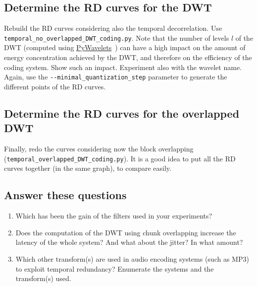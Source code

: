 \subsection{Determine the RD curves for the DWT}

Rebuild the RD curves considering also the temporal decorrelation. Use
\verb|temporal_no_overlapped_DWT_coding.py|. Note that the number of
levels $l$ of the DWT (computed using
\href{https://pywavelets.readthedocs.io/en/latest/}{PyWavelets}~\cite{lee2019pywavelets})
can have a high impact on the amount of energy concentration achieved
by the DWT, and therefore on the efficiency of the coding system. Show
such an impact. Experiment also with the wavelet name. Again, use the
\verb|--minimal_quantization_step| parameter to generate the different
points of the RD curves.


\subsection{Determine the RD curves for the overlapped DWT}

Finally, redo the curves considering now the block overlapping
(\verb|temporal_overlapped_DWT_coding.py|). It is a good idea to put
all the RD curves together (in the same graph), to compare easily.


\subsection{Answer these questions}

\begin{enumerate}
  
\item Which has been the gain of the filters used in your experiments?

\item Does the computation of the DWT using chunk overlapping increase
  the latency of the whole system? And what about the jitter? In what amount?

\item Which other transform(s) are used in audio encoding systems
  (such as MP3) to exploit temporal redundancy? Enumerate the
  systems and the transform(s) used.

\end{enumerate}


